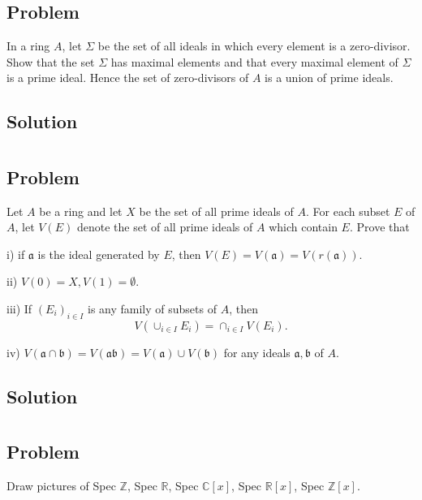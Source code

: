 \documentclass[book,12pt,oneside,openany]{memoir}
\begin{document}
\section{}
\subsection{Problem}
In a ring $A$, let $\Sigma$ be the set of all ideals in which every element is a zero-divisor. Show that the set $\Sigma$ has maximal elements and that every maximal element of $\Sigma$ is a prime ideal. Hence the set of zero-divisors of $A$ is a union of prime ideals.
\subsection{Solution}



\section{}
\subsection{Problem}
Let $A$ be a ring and let $X$ be the set of all prime ideals of $A$. For each subset $E$ of $A$, let $V(E)$ denote the set of all prime ideals of $A$ which contain $E$. Prove that

i) if $\mathfrak{a}$ is the ideal generated by $E$, then $V(E) = V(\mathfrak{a}) = V(r(\mathfrak{a}))$.

ii) $V(0) = X, V(1) = \emptyset$.

iii) If $(E_i)_{i \in I}$ is any family of subsets of $A$, then \[V (\cup_{i \in I} E_i ) = \cap_{i \in I} V(E_i).\]

iv) $V(\mathfrak{a} \cap \mathfrak{b}) = V(\mathfrak{a}\mathfrak{b}) = V(\mathfrak{a}) \cup V(\mathfrak{b})$ for any ideals $\mathfrak{a}, \mathfrak{b}$ of $A$.

\subsection{Solution}



\section{}
\subsection{Problem}
Draw pictures of Spec $\mathbb{Z}$, Spec $\mathbb{R}$, Spec $\mathbb{C}[x]$, Spec $\mathbb{R}[x]$, Spec $\mathbb{Z}[x]$.
\end{document}
